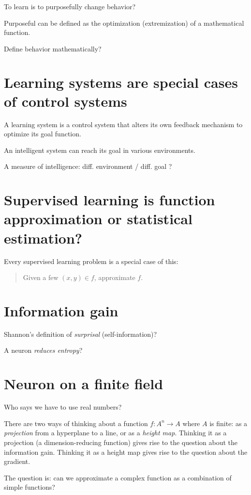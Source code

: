 To learn is to purposefully change behavior?

Purposeful can be defined as the optimization (extremization) of a mathematical function.

Define behavior mathematically?

\section{Learning systems are special cases of control systems}

A learning system is a control system that alters
its own feedback mechanism to optimize its goal function.

An intelligent system can reach its goal in various environments.

A measure of intelligence: diff. environment / diff. goal ?

\section{Supervised learning is function approximation or statistical estimation?}

Every supervised learning problem is a special case of this:
\begin{quote}
Given a few \((x,y) \in f\), approximate \(f\).
\end{quote}

\section{Information gain}

Shannon's definition of \emph{surprisal} (self-information)?

A neuron \emph{reduces entropy}?

\section{Neuron on a finite field}

Who says we have to use real numbers?

There are two ways of thinking about a function \(f : A^n \to A\) where \(A\) is finite:
as a \emph{projection} from a hyperplane to a line,
or as a \emph{height map}.
Thinking it as a projection (a dimension-reducing function)
gives rise to the question about the information gain.
Thinking it as a height map gives rise to the question about the gradient.

The question is: can we approximate a complex function as a combination of simple functions?

